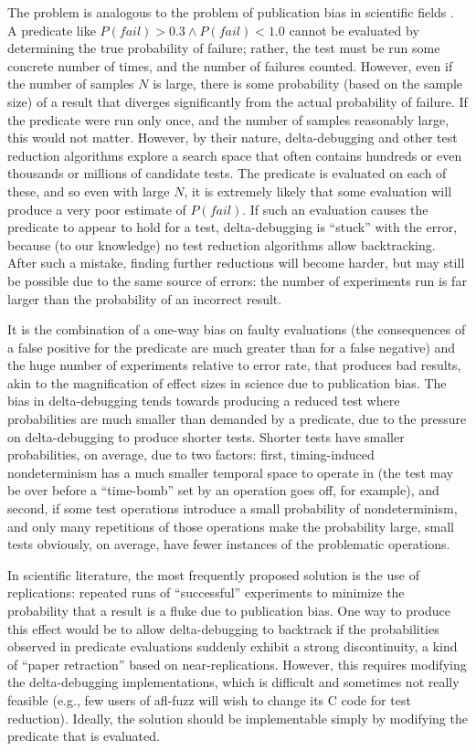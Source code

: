 The problem is analogous to the problem of publication bias in
scientific fields \cite{ahmed2012assessment}.  A predicate like
$P(fail) > 0.3 \wedge P(fail) < 1.0$ cannot be evaluated by
determining the true probability of failure; rather, the test must be
run some concrete number of times, and the number of failures counted.
However, even if the number of samples $N$ is large, there is some
probability (based on the sample size) of a result that diverges
significantly from the actual probability of failure.  If the
predicate were run only once, and the number of samples reasonably
large, this would not matter.  However, by their nature,
delta-debugging and other test reduction algorithms explore a search
space that often contains hundreds or even thousands or millions of
candidate tests.  The predicate is evaluated on each of these, and so
even with large $N$, it is extremely likely that some evaluation will
produce a very poor estimate of $P(fail)$.  If such an evaluation
causes the predicate to appear to hold for a test, delta-debugging is
``stuck'' with the error, because (to our knowledge) no test reduction
algorithms allow backtracking.  After such a mistake, finding further
reductions will become harder, but may still be possible due to the
same source of errors:  the number of experiments run is far larger
than the probability of an incorrect result.



It is the combination of
a one-way bias on faulty evaluations (the consequences of a false
positive for the predicate are much greater than for a false negative)
and the huge number of experiments relative to error rate, that
produces bad results, akin to the magnification of effect sizes
in science due to publication bias.  The bias in delta-debugging tends
towards producing a reduced test where probabilities are much smaller
than demanded by a predicate, due to the pressure on delta-debugging
to produce shorter tests.  Shorter tests have smaller probabilities,
on average, due to two factors:  first, timing-induced nondeterminism
has a much smaller temporal space to operate in (the test may be over
before a ``time-bomb'' set by an operation goes off, for example), and second, if some
test operations introduce a small probability of nondeterminism, and
only many repetitions of those operations make the probability large,
small tests obviously, on average, have fewer instances of the
problematic operations.

In scientific literature, the most frequently proposed solution is the
use of replications:  repeated runs of ``successful'' experiments to
minimize the probability that a result is a fluke due to publication
bias.  One way to produce this effect would be to allow
delta-debugging to backtrack if the probabilities observed in predicate
evaluations suddenly exhibit a strong discontinuity, a kind of ``paper
retraction'' based on near-replications.  However, this requires
modifying the delta-debugging implementations, which is difficult and
sometimes not really feasible (e.g., few users of afl-fuzz \cite{aflfuzz} will wish
to change its C code for test reduction).  Ideally, the solution
should be implementable simply by modifying the predicate that is
evaluated.  

